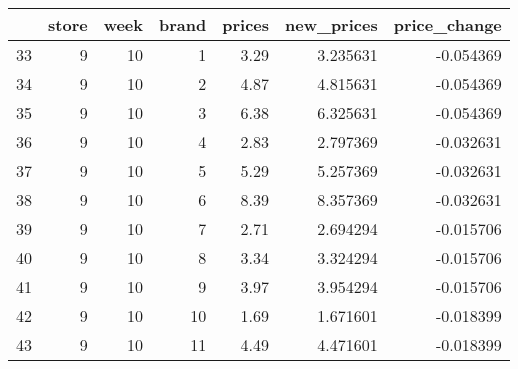 \begin{tabular}{lrrrrrr}
\toprule
{} &  store &  week &  brand &  prices &  new\_prices &  price\_change \\
\midrule
33 &      9 &    10 &      1 &    3.29 &    3.235631 &     -0.054369 \\
34 &      9 &    10 &      2 &    4.87 &    4.815631 &     -0.054369 \\
35 &      9 &    10 &      3 &    6.38 &    6.325631 &     -0.054369 \\
36 &      9 &    10 &      4 &    2.83 &    2.797369 &     -0.032631 \\
37 &      9 &    10 &      5 &    5.29 &    5.257369 &     -0.032631 \\
38 &      9 &    10 &      6 &    8.39 &    8.357369 &     -0.032631 \\
39 &      9 &    10 &      7 &    2.71 &    2.694294 &     -0.015706 \\
40 &      9 &    10 &      8 &    3.34 &    3.324294 &     -0.015706 \\
41 &      9 &    10 &      9 &    3.97 &    3.954294 &     -0.015706 \\
42 &      9 &    10 &     10 &    1.69 &    1.671601 &     -0.018399 \\
43 &      9 &    10 &     11 &    4.49 &    4.471601 &     -0.018399 \\
\bottomrule
\end{tabular}

